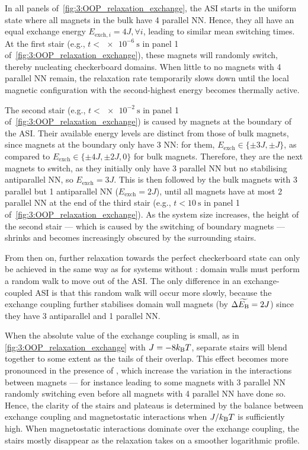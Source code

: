 In all panels of~\cref{fig:3:OOP_relaxation_exchange}, the ASI starts in the uniform state where all magnets in the bulk have 4 parallel NN.
Hence, they all have an equal exchange energy $E_{\mathrm{exch},i} = 4J, \forall i$, leading to similar mean switching times.
At the first stair (e.g., $t < \SI{e-6}{\second}$ in panel 1 of~\cref{fig:3:OOP_relaxation_exchange}), these magnets will randomly switch, thereby nucleating checkerboard domains.
When little to no magnets with 4 parallel NN remain, the relaxation rate temporarily slows down until the local magnetic configuration with the second-highest energy becomes thermally active. \par
The second stair (e.g., $t < \SI{e-2}{\second}$ in panel 1 of~\cref{fig:3:OOP_relaxation_exchange}) is caused by magnets at the boundary of the ASI.
Their available energy levels are distinct from those of bulk magnets, since magnets at the boundary only have 3 NN: for them, $E_\mathrm{exch} \in \{\pm 3J, \pm J\}$, as compared to $E_\mathrm{exch} \in \{\pm 4J, \pm 2J, 0\}$ for bulk magnets.
Therefore, they are the next magnets to switch, as they initially only have 3 parallel NN but no stabilising antiparallel NN, so $E_\mathrm{exch} = 3J$.
This is then followed by the bulk magnets with 3 parallel but 1 antiparallel NN ($E_\mathrm{exch} = 2J$), until all magnets have at most 2 parallel NN at the end of the third stair (e.g., $t < \SI{10}{\second}$ in panel 1 of~\cref{fig:3:OOP_relaxation_exchange}).
As the system size increases, the height of the second stair --- which is caused by the switching of boundary magnets --- shrinks and becomes increasingly obscured by the surrounding stairs. \par
From then on, further relaxation towards the perfect checkerboard state can only be achieved in the same way as for systems without : domain walls must perform a random walk to move out of the ASI.
The only difference in an exchange-coupled ASI is that this random walk will occur more slowly, because the exchange coupling further stabilises domain wall magnets (by $\Delta \widetilde{E_\mathrm{B}} = 2J$) since they have 3 antiparallel and 1 parallel NN. \par
When the absolute value of the exchange coupling is small, as in \cref{fig:3:OOP_relaxation_exchange} with $J=-8\kBT$, separate stairs will blend together to some extent as the tails of their  overlap.
This effect becomes more pronounced in the presence of , which increase the variation in the interactions between magnets --- for instance leading to some magnets with 3 parallel NN randomly switching even before all magnets with 4 parallel NN have done so.
Hence, the clarity of the stairs and plateaus is determined by the balance between exchange coupling and magnetostatic interactions when $J/\kBT$ is sufficiently high.
When magnetostatic interactions dominate over the exchange coupling, the stairs mostly disappear as the relaxation takes on a smoother logarithmic profile.


